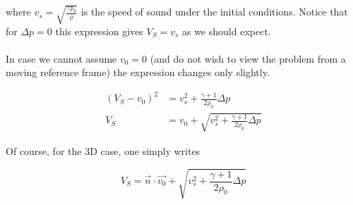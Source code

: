 where $v_s = \sqrt{\frac{\gamma p_0}{\rho}}$ is the speed of sound under the initial conditions. Notice that for $\Delta p = 0$ this expression gives $V_S = v_s$ as we should expect.\\
\\
In case we cannot assume $v_0 = 0$ (and do not wish to view the problem from a moving reference frame) the expression changes only slightly.

\begin{equation}
\label{eq:Riemann-solution2}
\begin{split}
(V_S - v_0)^2 &= v_s^2 + \frac{\gamma + 1}{2 \rho_0} \Delta p \\
V_S &= v_0 + \sqrt{v_s^2 + \frac{\gamma + 1}{2 \rho_0} \Delta p}
\end{split}
\end{equation}

Of course, for the 3D case, one simply writes

\begin{equation}
\label{eq:Riemann-solution-3D}
V_S = \vec{n} \cdot \vec{v_0} + \sqrt{v_s^2 + \frac{\gamma + 1}{2 \rho_0} \Delta p}
\end{equation}






